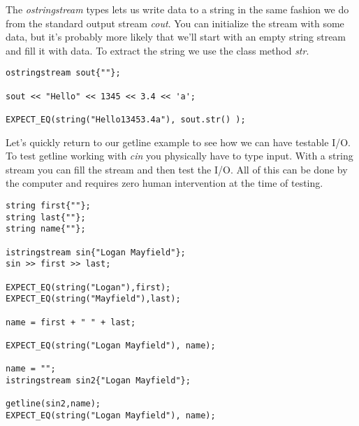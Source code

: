 \documentclass[]{tufte-handout}
\begin{document}
The \textit{ostringstream} types lets us write data to a string in the same fashion we do from the standard output stream \textit{cout}. You can initialize the stream with some data, but it's probably more likely that we'll start with an empty string stream and fill it with data. To extract the string we use the class method \textit{str}.
\begin{verbatim}
ostringstream sout{""};

sout << "Hello" << 1345 << 3.4 << 'a';

EXPECT_EQ(string("Hello13453.4a"), sout.str() );
\end{verbatim}

Let's quickly return to our getline example to see how we can have testable I/O.  To test getline working with \textit{cin} you physically have to type input. With a string stream you can fill the stream and then test the I/O. All of this can be done by the computer and requires zero human intervention at the time of testing.
\begin{verbatim}
string first{""};
string last{""};
string name{""};

istringstream sin{"Logan Mayfield"};
sin >> first >> last;

EXPECT_EQ(string("Logan"),first);
EXPECT_EQ(string("Mayfield"),last);
    
name = first + " " + last;

EXPECT_EQ(string("Logan Mayfield"), name);

name = "";
istringstream sin2{"Logan Mayfield"};

getline(sin2,name);
EXPECT_EQ(string("Logan Mayfield"), name);
\end{verbatim}
\end{document}
